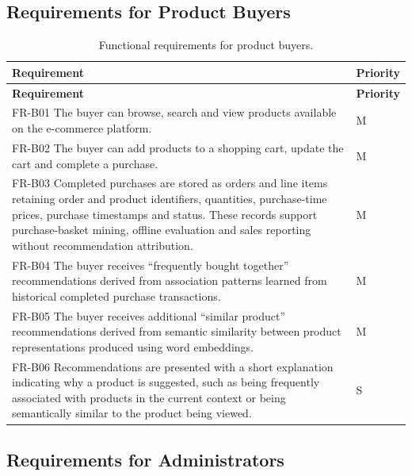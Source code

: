 \documentclass[a4paper,12pt]{article}
\newcommand{\tablestyle}{%
  \small\setstretch{1.05}%
  \renewcommand{\arraystretch}{1.25}%
  \setlength{\extrarowheight}{3pt}%
  \arrayrulecolor{tableborder}%
}
\newcommand{\req}[1]{\textsf{\small #1}}
\begin{document}
\subsection{Requirements for Product Buyers}

{\tablestyle
\begin{longtable}{|L{\dimexpr\textwidth-2cm-4\arrayrulewidth\relax}|C{2cm}|}
  \caption{Functional requirements for product buyers.}
  \label{tab:fr-buyer}\\
  \hline
  \textbf{Requirement} & \textbf{Priority} \\
  \hline
  \endfirsthead
  \hline
  \textbf{Requirement} & \textbf{Priority} \\
  \hline
  \endhead
  \endfoot
  \endlastfoot

  \req{FR-B01} The buyer can browse, search and view products available on the e-commerce platform. & M \\[3pt]\hline
  \req{FR-B02} The buyer can add products to a shopping cart, update the cart and complete a purchase. & M \\[3pt]\hline
  \req{FR-B03} Completed purchases are stored as orders and line items retaining order and product
  identifiers, quantities, purchase-time prices, purchase timestamps and status. These records support
  purchase-basket mining, offline evaluation and sales reporting without recommendation attribution. & M \\[3pt]\hline
  \req{FR-B04} The buyer receives ``frequently bought together'' recommendations derived from association
  patterns learned from historical completed purchase transactions. & M \\[3pt]\hline
  \req{FR-B05} The buyer receives additional ``similar product'' recommendations derived from semantic
  similarity between product representations produced using word embeddings. & M \\[3pt]\hline
  \req{FR-B06} Recommendations are presented with a short explanation indicating why a product is suggested,
  such as being frequently associated with products in the current context or being semantically
  similar to the product being viewed. & S \\[3pt]\hline
\end{longtable}
}


\subsection{Requirements for Administrators}
\end{document}
